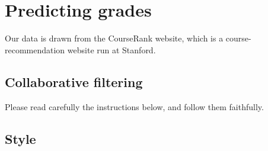 \documentclass{article} %
\begin{document}
\section{Predicting grades}
Our data is drawn from the CourseRank website, which is a course-recommendation website run at Stanford.




\subsection{Collaborative filtering}

Please read carefully the
instructions below, and follow them faithfully.
\subsection{Style}








%


\end{document}
